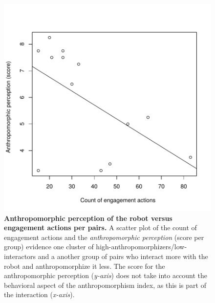 \documentclass[letterpaper, 10pt, conference]{ieeeconf}
\begin{document}
\begin{figure}[t]
    \centering
    \includegraphics[width=0.6\columnwidth]{domino-correlation.pdf}   

    \caption{\small \textbf{Anthropomorphic perception of the robot versus
        engagement actions per pairs.} A scatter plot of the count of engagement
        actions and the \textit{anthropomorphic
        perception} (score per group) evidence one cluster of
        high-anthropomorphizers/low-interactors and a another group of pairs who
        interact more with the robot and anthropomorphize it less. The score for
        the anthropomorphic perception (\textit{y-axis}) does not take into
        account the behavioral aspect of the anthropomorphism index, as this is
        part of the interaction (\textit{x-axis}).}

    \label{fig:domino-anthropo-interaction}
\end{figure}	

\end{document}
